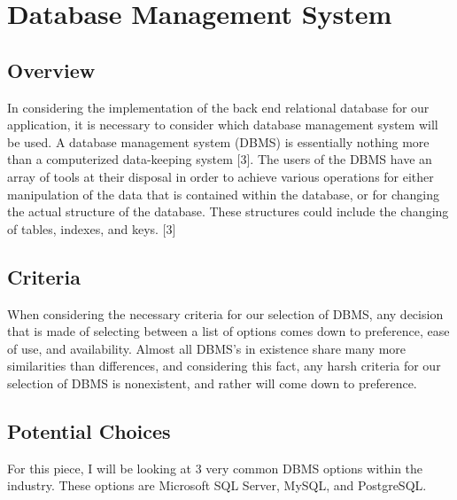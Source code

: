 \documentclass[onecolumn, draftclsnofoot,10pt, compsoc]{IEEEtran}
\begin{document}
\section{Database Management System}

\subsection{Overview}
In considering the implementation of the back end relational database for our application, it is necessary to consider which database management system will be used. A database management system (DBMS) is essentially nothing more than a computerized data-keeping system [3]. The users of the DBMS have an array of tools at their disposal in order to achieve various operations for either manipulation of the data that is contained within the database, or for changing the actual structure of the database. These structures could include the changing of tables, indexes, and keys. [3]

\subsection{Criteria}
When considering the necessary criteria for our selection of DBMS, any decision that is made of selecting between a list of options comes down to preference, ease of use, and availability. Almost all DBMS's in existence share many more similarities than differences, and considering this fact, any harsh criteria for our selection of DBMS is nonexistent, and rather will come down to preference.

\subsection{Potential Choices }
For this piece, I will be looking at 3 very common DBMS options within the industry. These options are Microsoft SQL Server, MySQL, and PostgreSQL.
\end{document}
